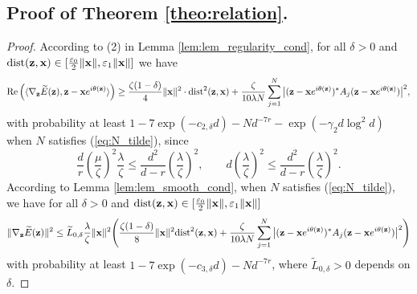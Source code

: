 \documentclass{article}
\renewcommand{\eqref}[1]{(\ref{#1})}
\newcommand{\re}{{\rm Re}}
\newcommand{\dist}{{\rm dist}}
\newcommand{\vx}{{\mathbf x}}
\newcommand{\vz}{{\mathbf z}}
\newcommand{\0}{{\mathbf 0}}
\numberwithin{equation}{section}
\begin{document}
	\subsection{Proof of Theorem \ref{theo:relation}.}\label{subsec:proof_convergence1}
	\begin{proof}
		According to (2) in Lemma \ref{lem:lem_regularity_cond}, for all $\delta>0$ and $\dist(\vz,\vx)\in[\frac{\varepsilon_0}2\|\vx\|,\varepsilon_1\|\vx\|]$ we have  
		\begin{equation}\label{curvature_condition_tilde}
			\re\left(\langle\nabla_{\vz} \widetilde E(\vz),\vz-\vx e^{i\theta(\vz)}\rangle\right)\ge \frac{\zeta(1-\delta)}{4}\|\vx\|^2\cdot\dist^2(\vz,\vx)+\frac{\zeta}{10\lambda N}\sum_{j=1}^{N}\big|(\vz-\vx e^{i\theta(\vz)})^*A_j(\vz-\vx e^{i\theta(\vz)})\big|^2,
		\end{equation}
		with probability at least  $1-7\exp(-c_{2,\delta} d)-Nd^{-7r}
		-\exp(-\gamma_2 d\log^2 d)$ when $N$ satisfies \eqref{eq:N_tilde}, since 
		\[
		\frac dr\left(\frac\mu\zeta\right)^2\frac\lambda\zeta
		\le
		\frac{d^2}{d-r}\left(\frac\lambda\zeta\right)^2,
		\qquad
		d\left(\frac\lambda\zeta\right)^2
		\le
		\frac{d^2}{d-r}\left(\frac\lambda\zeta\right)^2.
		\]
		According to Lemma \ref{lem:lem_smooth_cond}, 
		when $N$ satisfies \eqref{eq:N_tilde}, we have for all $\delta>0$ and $\dist(\vz,\vx)\in[\frac{\varepsilon_0}2\|\vx\|,\varepsilon_1\|\vx\|]$
		\begin{equation}	\label{smooth_cond_tilde}
			\|\nabla_{\vz} \widetilde E(\vz)\|^2
			\leq \widetilde L_{0,\delta}\frac{\lambda}{\zeta}\|\vx\|^2\Bigg(\frac{\zeta(1-\delta)}{8}\|\vx\|^2\dist^2(\vz, \vx)+\frac{\zeta}{10\lambda N}\sum_{j=1}^{N}\big|(\vz-\vx e^{i\theta(\vz)})^*A_j(\vz-\vx e^{i\theta(\vz)})\big|^2\Bigg)
		\end{equation}
		with probability at least $1-7\exp(-c_{3,\delta} d)-Nd^{-7r}$, where $\widetilde L_{0,\delta}>0$ depends on $\delta$.
		

\end{proof}
\end{document}
